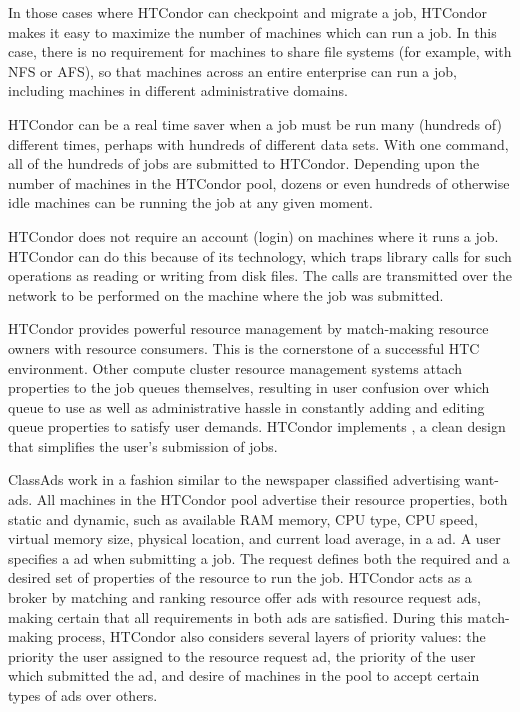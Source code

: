 In those cases where HTCondor can checkpoint and migrate a job,
HTCondor makes it easy to maximize the number of machines which can run
a job.
In this case, there is no requirement for machines to
share file systems (for example, with NFS or AFS),
so that machines across an entire enterprise can run a job,
including machines in different administrative domains.

HTCondor can be a real time saver when a job
must be run many (hundreds of) different times,
perhaps with hundreds of different data sets.
With one command, all of the hundreds of jobs are submitted to HTCondor.
Depending upon the number of machines in the HTCondor pool,
dozens or even hundreds of otherwise idle machines
can be running the job at any given moment.

HTCondor does not require an account (login) on machines where it runs a job.
HTCondor can do this because of its 
technology,
which traps
library calls for such operations as reading or writing from disk
files.
The calls are transmitted over the network to be performed on the machine
where the job was submitted.

HTCondor provides powerful resource management by
match-making resource
owners with resource consumers.
This is the cornerstone of a successful HTC environment.
Other compute cluster resource management
systems attach properties to the job queues themselves,
resulting in user confusion over which queue to use as well as administrative
hassle in constantly adding and editing queue properties to satisfy user
demands.
HTCondor implements 
,
a clean design that simplifies the user's submission of jobs.

ClassAds work in a fashion similar to the newspaper classified
advertising want-ads. All machines in the HTCondor pool advertise their
resource properties, both static and dynamic,
such as available RAM memory, CPU type, CPU speed,
virtual memory size, physical location, and current load average,
in a  ad.
A user specifies a  ad
when submitting a job.
The request defines both the required and a desired set of properties
of the resource to run the job.
HTCondor acts as a broker by matching and ranking resource
offer ads with resource request ads, making certain that all
requirements in both ads are satisfied.
During this match-making process,
HTCondor also considers several layers of priority values:
the priority the user assigned to the resource request ad,
the priority of the user which submitted the ad,
and desire of
machines in the pool to accept certain types of ads over others. 

